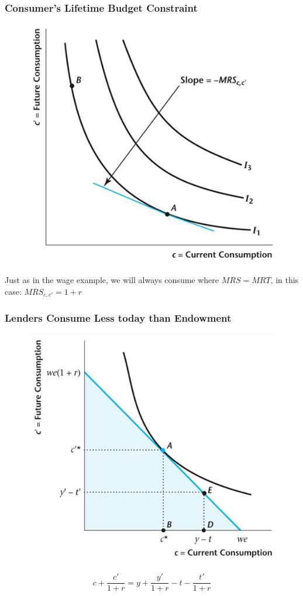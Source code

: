 \documentclass{beamer}
\begin{document}
\begin{frame}
\frametitle[alignment=center]{Consumer's Lifetime Budget Constraint}
\begin{figure}
\centering
\includegraphics[scale=0.5]{Figures/W_Fig_9pt2.png}
\end{figure}
Just as in the wage example, we will always consume where $MRS=MRT$, in this case: $MRS_{c,c'}=1+r$
\end{frame}

\begin{frame}
\frametitle[alignment=center]{Lenders Consume Less today than Endowment}
\begin{figure}
\centering
\includegraphics[scale=0.5]{Figures/W_Fig_9pt3.png}
\end{figure}
$$c+\frac{c'}{1+r}=y+\frac{y'}{1+r}-t-\frac{t'}{1+r}$$
\end{frame}
\end{document}
